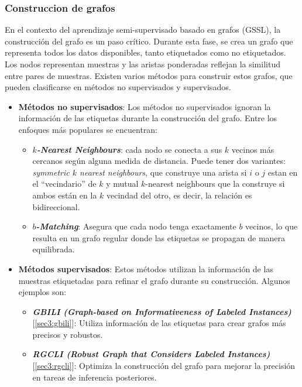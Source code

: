 \subsubsection{Construccion de grafos}
En el contexto del aprendizaje semi-supervisado basado en grafos (GSSL), la construcción del grafo es un paso crítico. Durante esta fase, se crea un grafo que representa todos los datos disponibles, tanto etiquetados como no etiquetados. Los nodos representan muestras y las aristas ponderadas reflejan la similitud entre pares de muestras. Existen varios métodos para construir estos grafos, que pueden clasificarse en métodos no supervisados y supervisados.
\begin{itemize}
	\item \textbf{Métodos no supervisados}: Los métodos no supervisados ignoran la información de las etiquetas durante la construcción del grafo. Entre los enfoques más populares se encuentran:
	\begin{itemize}
		\item \textbf{\textit{$k$-Nearest Neighbours}}: cada nodo se conecta a sus $k$ vecinos más cercanos según alguna medida de distancia. Puede tener dos variantes: \textit{symmetric $k$ nearest neighbours}, que construye una arista si $i$ o $j$ estan en el ``vecindario'' de $k$ y mutual $k$-nearest neighbours que la construye si ambos están en la $k$ vecindad del otro, es decir, la relación es bidireccional.
		\item \textbf{\textit{$b$-Matching}}: Asegura que cada nodo tenga exactamente $b$ vecinos, lo que resulta en un grafo regular donde las etiquetas se propagan de manera equilibrada.
	\end{itemize}
	\item \textbf{Métodos supervisados}: Estos métodos utilizan la información de las muestras etiquetadas para refinar el grafo durante su construcción. Algunos ejemplos son:
	\begin{itemize}
		\item \textbf{\textit{GBILI (Graph-based on Informativeness of Labeled Instances)}} [\ref{sec3:gbili}]: Utiliza información de las etiquetas para crear grafos más precisos y robustos.
		\item \textbf{\textit{RGCLI (Robust Graph that Considers Labeled Instances)}} [\ref{sec3:rgcli}]: Optimiza la construcción del grafo para mejorar la precisión en tareas de inferencia posteriores.
	\end{itemize}
\end{itemize}

